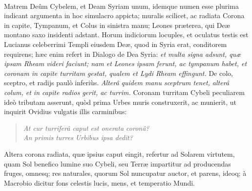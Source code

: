 \documentclass[a4paper, 11pt, oneside, polutonikogreek, latin]{article}
\begin{document}
\paragraph{}
Matrem Deûm Cybelem, et Deam Syriam unum, idemque numen esse plurima indicant argumenta in hoc simulacro appicta; muralis scilicet, ac radiata Corona in capite, Tympanum, et Colus in sinistra manu; Leones præterea, qui Deæ montano saxo insidenti adstant. Horum indiciorum locuples, et oculatus testis est Lucianus celeberrimi Templi eiusdem Deæ, quod in Syria erat, conditorem requirens; hæc enim refert in Dialogo de Dea Syria: \emph{et multa signa adsunt, quæ ipsam Rheam videri faciunt; nam et Leones ipsam ferunt, ac tympanum habet, et coronam in capite turritam gestat, qualem et Lydi Rheam effingunt.} De colo, sceptro, et radijs paulò inferiùs. \emph{Alterâ quidem manu sceptrum tenet, alterâ colum, et in capite radios gerit, ac turrim.} Coronam turritam Cybeli peculiarem ideò tributam asserunt, quòd prima Urbes muris construxerit, ac munierit, ut inquirit Ovidius vulgatis illis carminibus:
\begin{quote}
\emph{At cur turriferâ caput est onerata coronâ?}\\
\emph{An primis turres Urbibus ipsa dedit?}\\
\end{quote}
Altera corona radiata, quæ ipsius caput eingit, refertur ad Solarem virtutem, quam Sol benefico lumine suo Cybeli, seu Terræ impartitur ad producendas fruges, omnesq; res naturales, quorum Sol nuncupatur auctor, et parens, ideoq; à Macrobio dicitur fons celestis lucis, mens, et temperatio Mundi.
\end{document}
